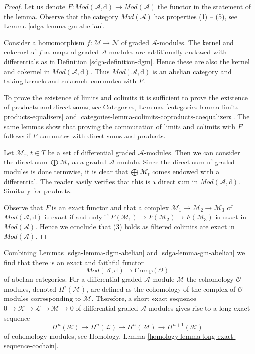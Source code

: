 \begin{proof}

Let us denote
$F : \textit{Mod}(\mathcal{A}, \text{d}) \to \textit{Mod}(\mathcal{A})$
the functor in the statement of the lemma. Observe that
the category $\textit{Mod}(\mathcal{A})$ has properties (1) -- (5), see
Lemma \ref{sdga-lemma-gm-abelian}.

\medskip\noindent
Consider a homomorphism $f : \mathcal{M} \to \mathcal{N}$
of graded $\mathcal{A}$-modules. The kernel
and cokernel of $f$ as maps of graded $\mathcal{A}$-modules
are additionally endowed with differentials as in
Definition \ref{sdga-definition-dgm}. Hence these are also
the kernel and cokernel in $\textit{Mod}(\mathcal{A}, \text{d})$.
Thus $\textit{Mod}(\mathcal{A}, \text{d})$ is an abelian category
and taking kernels and cokernels commutes with $F$.

\medskip\noindent
To prove the existence of limits and colimits it is sufficient
to prove the existence of products and direct sums, see
Categories, Lemmas \ref{categories-lemma-limits-products-equalizers} and
\ref{categories-lemma-colimits-coproducts-coequalizers}.
The same lemmas show that
proving the commutation of limits and colimits with $F$
follows if $F$ commutes with direct sums and products.

\medskip\noindent
Let $\mathcal{M}_t$, $t \in T$ be a set of differential
graded $\mathcal{A}$-modules. Then we can consider the direct
sum $\bigoplus \mathcal{M}_t$ as a graded $\mathcal{A}$-module.
Since the direct sum of graded modules is done termwise, it is
clear that $\bigoplus \mathcal{M}_t$ comes endowed with a differential.
The reader easily verifies that this is a direct sum in
$\textit{Mod}(\mathcal{A}, \text{d})$. Similarly for products.

\medskip\noindent
Observe that $F$ is an exact functor and that
a complex $\mathcal{M}_1 \to \mathcal{M}_2 \to \mathcal{M}_3$
of $\textit{Mod}(\mathcal{A}, \text{d})$ is exact if and only if
$F(\mathcal{M}_1) \to F(\mathcal{M}_2) \to F(\mathcal{M}_3)$
is exact in $\textit{Mod}(\mathcal{A})$. Hence we conclude that (3)
holds as filtered colimits are exact in
$\textit{Mod}(\mathcal{A})$.
\end{proof}

Combining Lemmas \ref{sdga-lemma-dgm-abelian} and \ref{sdga-lemma-gm-abelian}
we find that there is an exact and faithful functor
$$
\textit{Mod}(\mathcal{A}, \text{d}) \longrightarrow \text{Comp}(\mathcal{O})
$$
of abelian categories. For a differential graded $\mathcal{A}$-module
$\mathcal{M}$ the cohomology $\mathcal{O}$-modules, denoted $H^i(\mathcal{M})$,
are defined as the cohomology of the complex of
$\mathcal{O}$-modules corresponding to $\mathcal{M}$.
Therefore, a short exact sequence
$0 \to \mathcal{K} \to \mathcal{L} \to \mathcal{M} \to 0$
of differential graded $\mathcal{A}$-modules
gives rise to a long exact sequence
\begin{equation}
\label{equation-les}
H^n(\mathcal{K}) \to H^n(\mathcal{L}) \to H^n(\mathcal{M}) \to
H^{n + 1}(\mathcal{K})
\end{equation}
of cohomology modules, see
Homology, Lemma \ref{homology-lemma-long-exact-sequence-cochain}.

